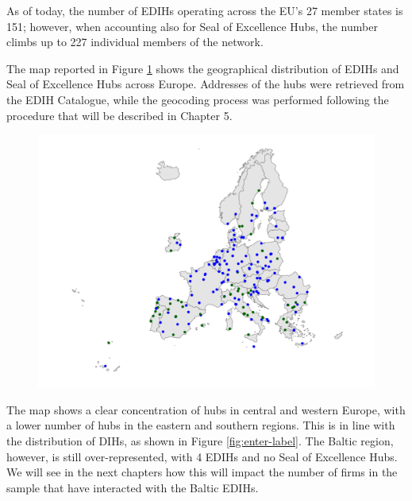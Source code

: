 \documentclass[12pt]{report}
\begin{document}
\par As of today, the number of EDIHs operating across the EU's 27 member states is 151; however, when accounting also for Seal of Excellence Hubs, the number climbs up to 227 individual members of the network.

\par The map reported in Figure \ref{fig:edih-soe-location-map} shows the geographical distribution of EDIHs and Seal of Excellence Hubs across Europe. Addresses of the hubs were retrieved from the EDIH Catalogue, while the geocoding process was performed following the procedure that will be described in Chapter 5. 

\begin{figure}[h]
    \centering
    \includegraphics[width=1\linewidth]{../Output/EDIH_and_Seal_of_Excellence_map.pdf}
    \caption{}
    \label{fig:edih-soe-location-map}
\end{figure}

\par The map shows a clear concentration of hubs in central and western Europe, with a lower number of hubs in the eastern and southern regions. This is in line with the distribution of DIHs, as shown in Figure \ref{fig:enter-label}. The Baltic region, however, is still over-represented, with 4 EDIHs and no Seal of Excellence Hubs. We will see in the next chapters how this will impact the number of firms in the sample that have interacted with the Baltic EDIHs.
\end{document}
